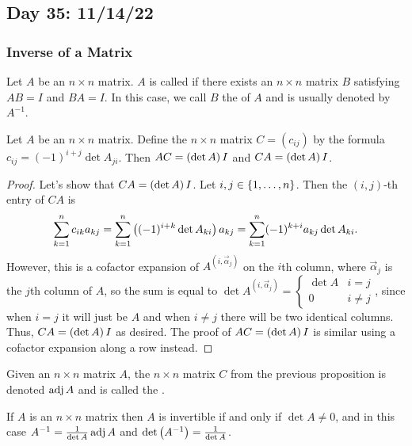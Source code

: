 \documentclass[main.tex]{subfiles}
\begin{document}
\subsection{Day 35: 11/14/22}

\subsubsection{Inverse of a Matrix}

\begin{definition}
    Let $A$ be an $n\times n$ matrix. $A$ is called  if there exists an $n\times n$ matrix $B$ satisfying $AB = I$ and $BA = I$. In this case, we call $B$ the  of $A$ and is usually denoted by $A^{-1}$.
\end{definition}

\begin{proposition}
    Let $A$ be an $n\times n$ matrix. Define the $n\times n$ matrix $C = (c_{ij})$ by the formula $c_{ij} = (-1)^{i + j}\det A_{ji}$. Then $AC = \left( \det A \right) I$ and $CA = \left( \det A \right) I$.
\end{proposition}

\begin{proof}
    Let's show that $CA = \left( \det A \right)I$. Let $i, j\in \left\{ 1, \ldots , n \right\}$. Then the $(i, j)$-th entry of $CA$ is
    \[\sum_{k = 1}^n c_{ik}a_{kj} = \sum_{k = 1}^n \left( (-1)^{i + k}\det A_{ki} \right) a_{kj} = \sum_{k = 1}^n (-1)^{k + i}a_{kj}\det A_{ki}.\]
    However, this is a cofactor expansion of $A^{(i, \vec\alpha_j)}$ on the $i$th column, where $\vec\alpha_j$ is the $j$th column of $A$, so the sum is equal to $\det A^{(i, \vec\alpha_j)} = \begin{cases} \det A & i = j \\ 0 & i \neq j \end{cases}$, since when $i = j$ it will just be $A$ and when $i\neq j$ there will be two identical columns. Thus, $CA = \left( \det A \right)I$ as desired. The proof of $AC = \left( \det A \right)I$ is similar using a cofactor expansion along a row instead.
\end{proof}

\begin{definition}
    Given an $n\times n$ matrix $A$, the $n\times n$ matrix $C$ from the previous proposition is denoted $\operatorname{adj} A$ and is called the .
\end{definition}

\begin{theorem}
    If $A$ is an $n\times n$ matrix then $A$ is invertible if and only if $\det A \neq 0$, and in this case $A^{-1} = \frac{1}{\det A}\operatorname{adj} A$ and $\det \left( A^{-1} \right) = \frac{1}{\det A}$.
\end{theorem}
\end{document}
